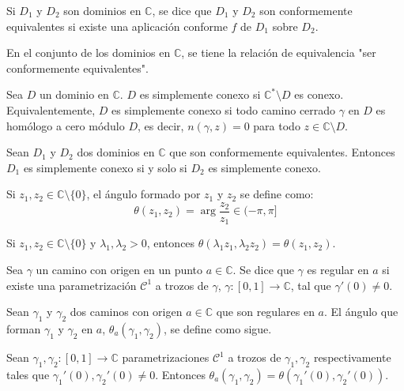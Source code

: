 \begin{definition}
    Si $D_1$ y $D_2$ son dominios en $\mathbb{C}$, se dice que $D_1$ y $D_2$ son conformemente equivalentes si existe una aplicación conforme $f$ de $D_1$ sobre $D_2$.

    En el conjunto de los dominios en $\mathbb{C}$, se tiene la relación de equivalencia "ser conformemente equivalentes".
\end{definition}

\begin{definition}
    Sea $D$ un dominio en $\mathbb{C}$.
    $D$ es simplemente conexo si $\mathbb{C}^\ast \setminus D$ es conexo.
    Equivalentemente, $D$ es simplemente conexo si todo camino cerrado $\gamma$ en $D$ es homólogo a cero módulo $D$, es decir, $n(\gamma, z) = 0$ para todo $z \in \mathbb{C} \setminus D$.
\end{definition}

\begin{theorem}
    Sean $D_1$ y $D_2$ dos dominios en $\mathbb{C}$ que son conformemente equivalentes.
    Entonces $D_1$ es simplemente conexo si y solo si $D_2$ es simplemente conexo.
\end{theorem}

\begin{definition}
    Si $z_1, z_2 \in \mathbb{C} \setminus \{0\}$, el ángulo formado por $z_1$ y $z_2$ se define como:
    $$\theta(z_1, z_2) = \arg \frac{z_2}{z_1} \in (-\pi, \pi]$$
\end{definition}

\begin{remark}
    Si $z_1, z_2 \in \mathbb{C} \setminus \{0\}$ y $\lambda_1, \lambda_2 > 0$, entonces $\theta(\lambda_1z_1, \lambda_2z_2) = \theta(z_1, z_2)$.
\end{remark}

\begin{definition}
    Sea $\gamma$ un camino con origen en un punto $a \in \mathbb{C}$.
    Se dice que $\gamma$ es regular en $a$ si existe una parametrización $\mathcal{C}^1$ a trozos de $\gamma$, $\gamma: [0, 1] \to \mathbb{C}$, tal que $\gamma'(0) \neq 0$.
\end{definition}

\begin{definition}
    Sean $\gamma_1$ y $\gamma_2$ dos caminos con origen $a \in \mathbb{C}$ que son regulares en $a$.
    El ángulo que forman $\gamma_1$ y $\gamma_2$ en $a$, $\theta_a(\gamma_1, \gamma_2)$, se define como sigue.

    Sean $\gamma_1, \gamma_2: [0, 1] \to \mathbb{C}$ parametrizaciones $\mathcal{C}^1$ a trozos de $\gamma_1, \gamma_2$ respectivamente tales que $\gamma_1'(0), \gamma_2'(0) \neq 0$.
    Entonces $\theta_a(\gamma_1, \gamma_2) = \theta(\gamma_1'(0), \gamma_2'(0))$.
\end{definition}


